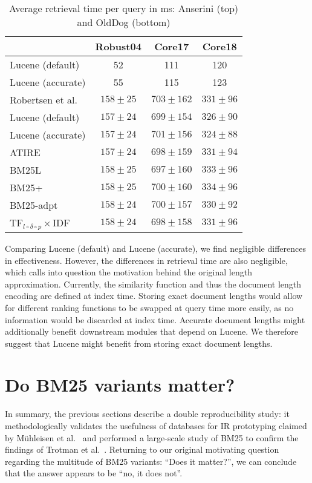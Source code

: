 \begin{table}
	\centering
	\caption{Average retrieval time per query in ms: Anserini (top) and OldDog (bottom)}
	\label{bm25_effiency}
	\begin{tabular}{l | c c c}
		\toprule
		&Robust04&Core17&Core18\\
		\midrule
		Lucene (default)&52&111&120\\
		Lucene (accurate)&55&115&123\\
		\midrule
		Robertsen et al.&$158\pm25$&$703\pm162$&$331\pm96$\\
		Lucene (default)&$157\pm24$&$699\pm154$&$326\pm90$\\
		Lucene (accurate)&$157\pm24$&$701\pm156$&$324\pm88$\\
		ATIRE&$157\pm24$&$698\pm159$&$331\pm94$\\
		BM25L&$158\pm25$&$697\pm160$&$333\pm96$\\
		BM25+&$158\pm25$&$700\pm160$&$334\pm96$\\
		BM25-adpt&$158\pm24$&$700\pm157$&$330\pm92$\\
		TF$_{l\circ\delta\circ p}\times$IDF&$158\pm24$&$698\pm158$&$331\pm96$ \\
		\bottomrule
	\end{tabular}
\end{table}

Comparing Lucene (default) and Lucene (accurate), we find negligible differences in effectiveness. However, the differences in retrieval time are also negligible, which calls into question the motivation behind the original length approximation. Currently, the similarity function and thus the document length encoding are defined at index time. Storing exact document lengths would allow for different ranking functions to be swapped at query time more easily, as no information would be discarded at index time. Accurate document lengths might additionally benefit downstream modules that depend on Lucene. We therefore suggest that Lucene might benefit from storing exact document lengths.
 
\section{Do BM25 variants matter?}
In summary, the previous sections describe a double reproducibility study: it methodologically validates the usefulness of databases for IR prototyping claimed by M\"{u}hleisen et al.~\cite{OldDog} and performed a large-scale study of BM25 to confirm the findings of Trotman et al.~\cite{trotman-bm25}. Returning to our original motivating question regarding the multitude of BM25 variants: ``Does it matter?'', we can conclude that the answer appears to be ``no, it does not''.